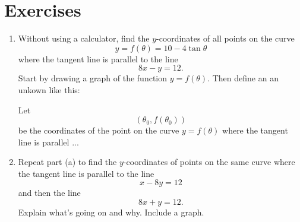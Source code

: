 \documentclass{ximera}
\begin{document}
\section{Exercises}

\begin{exercise} \label{Qpfef34}
\begin{enumerate}
\item Without using a calculator, find the $y$-coordinates of all points on the curve
\[
  y = f(\theta) = 10 - 4 \tan \theta
\]
where the tangent line is parallel to the line
\[
      8x - y = 12.
\]
Start by drawing a graph of the function $y=f(\theta)$. Then define an an unkown like this:

Let 
\[
  (\theta_0 , f(\theta_0))
\]
be the coordinates of the point on the curve $y=f(\theta)$ where the tangent line is parallel ...

\item Repeat part (a) to find the $y$-coordinates of points on the same curve where the tangent line is parallel to the line
\[
   x - 8y = 12
\]
and then the line
\[
   8x + y = 12.
\]
Explain what's going on and why. Include a graph.
\end{enumerate}
\end{exercise}
\end{document}
